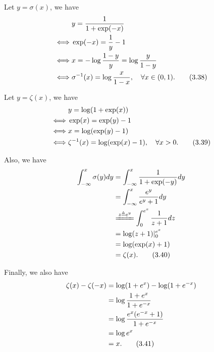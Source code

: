 \documentclass[11pt]{article}
\begin{document}
Let $y = \sigma(x)$, we have
\begin{align}
& y = \frac{1}{1+\exp(-x)} \notag\\
\iff & \exp(-x) = \frac{1}{y} - 1 \notag\\
\iff & x = -\log\frac{1-y}{y} = \log\frac{y}{1-y} \notag\\
\iff & \sigma^{-1}(x) = \log\frac{x}{1-x}, \quad\forall x\in(0,1). \tag{3.38}
\end{align}

Let $y = \zeta(x)$, we have
\begin{align}
& y = \log(1+\exp(x)) \notag\\
\iff & \exp(x) = \exp(y) - 1 \notag\\
\iff & x = \log(\exp(y)-1) \notag\\
\iff & \zeta^{-1}(x) = \log(\exp(x)-1), \quad \forall x>0. \tag{3.39}
\end{align}

Also, we have
\begin{align}
\int^x_{-\infty}\sigma(y)dy &= \int^x_{-\infty}\frac{1}{1+\exp(-y)}dy \notag\\
&= \int^x_{-\infty}\frac{e^y}{e^y+1}dy \notag \\
& \xlongequal{z\triangleq e^{y}} \int^{e^x}_{0}\frac{1}{z+1}dz \notag\\
&= \log(z+1) | ^{e^x}_0 \notag\\
&= \log(\exp(x) + 1) \notag\\
&= \zeta(x). \tag{3.40}
\end{align}

Finally, we also have
\begin{align}
\zeta(x) - \zeta(-x) &= \log(1+e^x) - \log(1+e^{-x}) \notag\\
&= \log\frac{1+e^x}{1+e^{-x}} \notag\\
&= \log\frac{e^x(e^{-x}+1)}{1+e^{-x}} \notag\\
&= \log e^x \notag\\
&= x. \tag{3.41}
\end{align}

\end{document}
